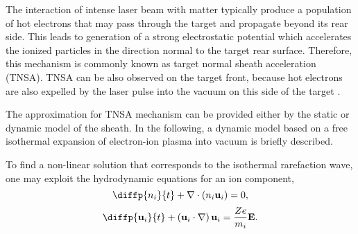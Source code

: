 The interaction of intense laser beam with matter typically produce a population of hot electrons that may pass through the target and propagate beyond its rear side. This leads to generation of a strong electrostatic potential which accelerates the ionized particles in the direction normal to the target rear surface. Therefore, this mechanism is commonly known as target normal sheath acceleration (TNSA). TNSA can be also observed on the target front, because hot electrons are also expelled by the laser pulse into the vacuum on this side of the target \cite{Macchi32013, Macchi22013}.

The approximation for TNSA mechanism can be provided either by the static or dynamic model of the sheath. In the following, a dynamic model based on a free isothermal expansion of electron-ion plasma into vacuum \cite{Mora2003} is briefly described.

To find a non-linear solution that corresponds to the isothermal rarefaction wave, one may exploit the hydrodynamic equations for an ion component,
\begin{equation}
\label{2.7.2.2}
\diffp{n_i}{t} + \div{\left(n_i \vec{u}_i\right)} = 0,
\end{equation}
\begin{equation}
\label{2.7.2.3}
\diffp{\vec{u}_i}{t} + \left(\vec{u}_i \cdot \grad{} \right) \vec{u}_i = \frac{Z e}{m_i} \vec{E}. 
\end{equation}

